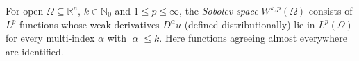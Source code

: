 
For open $\Omega\subseteq\mathbb R^n$, $k\in\mathbb N_0$ and $1\le p\le\infty$, the \emph{Sobolev space} $W^{k,p}(\Omega)$ consists of $L^p$ functions whose weak derivatives $D^\alpha u$ (defined distributionally) lie in $L^p(\Omega)$ for every multi-index $\alpha$ with $|\alpha|\le k$. Here functions agreeing almost everywhere are identified.
